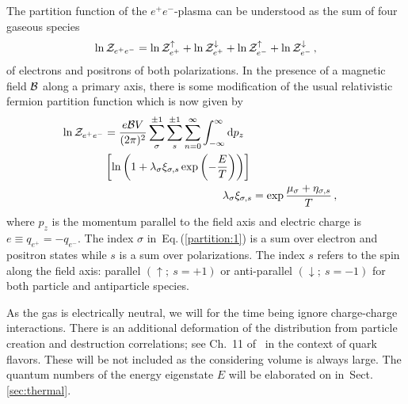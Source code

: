 \documentclass[aps,prd,floatfix,reprint]{revtex4-2}
\newcommand{\req}[1]{Eq.\,(\ref{#1})}
\newcommand{\rsec}[1]{Sect.\,{\ref{#1}}}
\begin{document}
The partition function of the $e^{+}e^{-}$-plasma can be understood as the sum of four gaseous species
\begin{align}
 \label{partition:0} 
 \ln{\cal Z}_{e^{+}e^{-}}=\ln{\cal Z}_{e^{+}}^{\uparrow}+\ln{\cal Z}_{e^{+}}^{\downarrow}+\ln{\cal Z}_{e^{-}}^{\uparrow}+\ln{\cal Z}_{e^{-}}^{\downarrow}\,,
\end{align}
of electrons and positrons of both polarizations. In the presence of a magnetic field ${\cal B}$ along a primary axis, there is some modification of the usual relativistic fermion partition function which is now given by
\begin{align}
 \begin{split}
 \label{partition:1}
 \ln{\cal Z}_{e^{+}e^{-}}&=\frac{e{\cal B}V}{(2\pi)^{2}}\sum_{\sigma}^{\pm1}\sum_{s}^{\pm1}\sum_{n=0}^{\infty}\int_{-\infty}^{\infty}{\rm d}p_{z}\\
 &\left[\ln\left(1+\lambda_{\sigma}\xi_{\sigma,s}\exp\left(-\frac{E}{T}\right)\right)\right]\, 
 \end{split}\\
 \label{partition:2} 
 \lambda_{\sigma}\xi_{\sigma, s} &= \exp{\frac{\mu_{\sigma}+\eta_{\sigma,s}}{T}}\,,
\end{align}
where $p_{z}$ is the momentum parallel to the field axis and electric charge is $e\equiv q_{e^{+}}=-q_{e^{-}}$. The index $\sigma$ in~\req{partition:1} is a sum over electron and positron states while $s$ is a sum over polarizations. The index $s$ refers to the spin along the field axis: parallel $(\uparrow;\ s=+1)$ or anti-parallel $(\downarrow;\ s=-1)$ for both particle and antiparticle species.

As the gas is electrically neutral, we will for the time being ignore charge-charge interactions. There is an additional deformation of the distribution from particle creation and destruction correlations; see Ch.~11 of~\cite{Letessier:2002ony} in the context of quark flavors. These will be not included as the considering volume is always large. The quantum numbers of the energy eigenstate $E$ will be elaborated on in~\rsec{sec:thermal}.
\end{document}
